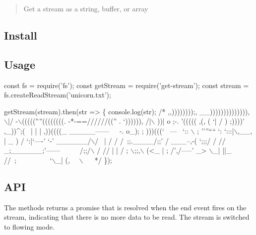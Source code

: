 \begin{quote}
Get a stream as a string, buffer, or array \end{quote}


\subsection*{Install}




\subsection*{Usage}


\begin{DoxyCode}
const fs = require('fs');
const getStream = require('get-stream');
const stream = fs.createReadStream('unicorn.txt');

getStream(stream).then(str => \{
  console.log(str);
  /*
                ,,))))))));,
             \_\_)))))))))))))),
  \(\backslash\)|/       -\(\backslash\)(((((''''((((((((.
  -*-==//////((''  .     `)))))),
  /|\(\backslash\)      ))| o    ;-.    '(((((                                  ,(,
           ( `|    /  )    ;))))'                               ,\_))^;(~
              |   |   |   ,))((((\_     \_\_\_\_\_------~~~-.        %
              o\_);   ;    )))(((` ~---~  `::           \(\backslash\)      %
                    ;    ''''````         `:       `:::|\(\backslash\),\_\_,%
                   |   \_                )     /      `:|`----'     `-'
             \_\_\_\_\_\_/\(\backslash\)/~    |                 /        /
           /~;;.\_\_\_\_/;;'  /          \_\_\_--,-(   `;;;/
          / //  \_;\_\_\_\_\_\_;'------~~~~~    /;;/\(\backslash\)    /
         //  | |                        / ;   \(\backslash\);;,\(\backslash\)
        (<\_  | ;                      /',/-----'  \_>
         \(\backslash\)\_| ||\_                     //~;~~~~~~~~~
             `\(\backslash\)\_|                   (,~~
\(\backslash\)
                                      ~~
  */
\});
\end{DoxyCode}


\subsection*{A\+PI}

The methods returns a promise that is resolved when the {\ttfamily end} event fires on the stream, indicating that there is no more data to be read. The stream is switched to flowing mode.

